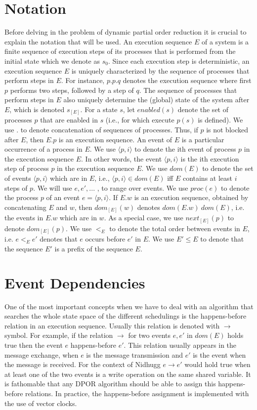 \section{Notation}

Before delving in the problem of dynamic partial order reduction it is crucial to explain the notation that will be used.
An execution sequence $E$ of a system is a finite sequence of
execution steps of its processes that is performed from the initial
state which we denote as $s_0$. Since each execution step is deterministic, an execution
sequence $E$ is uniquely characterized by the sequence of processes
that perform steps in $E$. For instance, $p.p.q$ denotes the execution
sequence where first $p$ performs two steps, followed by a step of $q$.
The sequence of processes that perform steps in $E$ also uniquely
determine the (global) state of the system after $E$, which is denoted
$s_{[E]}$. For a state $s$, let $enabled(s)$ denote the set of processes $p$ that
are enabled in $s$ (i.e., for which execute $p(s)$ is defined). We use $.$ to
denote concatenation of sequences of processes. Thus, if $p$ is not
blocked after $E$, then $E.p$ is an execution sequence.
An event of $E$ is a particular occurrence of a process in $E$.
We use $\langle p,i \rangle$ to denote the ith event of process $p$ in the execution
sequence $E$. In other words, the event $\langle p,i \rangle$ is the ith execution step
of process $p$ in the execution sequence $E$. We use $dom(E)$ to denote
the set of events $\langle p,i \rangle$ which are in $E$, i.e., $\langle p,i \rangle \in dom(E)$ iff $E$
contains at least $i$ steps of $p$. We will use $e,e',...$ , to range over
events. We use $proc(e)$ to denote the process $p$ of an event $e = \langle p, i \rangle$.
If $E.w$ is an execution sequence, obtained by concatenating $E$ and
$w$, then $dom_{[E]}(w)$ denotes $dom(E.w) \ dom(E)$, i.e. the events in
$E.w$ which are in $w$. As a special case, we use $next_{[E]}(p)$ to denote
$dom_{[E]}(p)$.
We use $<_E$ to denote the total order between events in $E$, i.e.
$e <_E e'$  denotes that $e$ occurs before $e'$  in $E$. We use $E'\leq E$ to
denote that the sequence $E'$ is a prefix of the sequence $E$.

\section{Event Dependencies}

One of the most important concepts when we have to deal with an algorithm that searches the whole state space of the different schedulings is the 
happens-before relation in an execution sequence. Usually this relation is denoted with $\rightarrow$ symbol. For example, if the relation $\rightarrow$ 
for two events $e,e'$ in $dom(E)$ holds true then the event $e$ happens-before $e'$. This relation usually appears in the message exchange, when $e$ is the message
transmission and $e'$ is the event when the message is received. For the context of Nidhugg $e \rightarrow e'$ would hold true when at least one of the two events
is a write operation on the same shared variable. It is fathomable that any DPOR algorithm should be able to assign this happens-before relations. 
In practice, the happens-before assignment is implemented with the use of vector clocks.

